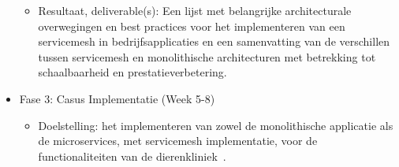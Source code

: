 \begin{itemize}
\begin{itemize}
\begin{itemize}
        \end{itemize}            
    \item Resultaat, deliverable(s): Een lijst met belangrijke architecturale overwegingen en best practices voor het implementeren van een servicemesh in bedrijfsapplicaties en een samenvatting van de verschillen tussen \linebreak servicemesh en monolithische architecturen met betrekking tot schaalbaarheid en prestatieverbetering.
    \end{itemize}
    \item Fase 3: Casus Implementatie (Week 5-8)
    \begin{itemize}
        \item Doelstelling: het implementeren van zowel de monolithische applicatie als de microservices, met servicemesh implementatie, voor de functionaliteiten van de dierenkliniek~\autocite{RameshMF2018}. 
        

\end{itemize}
\end{itemize}
